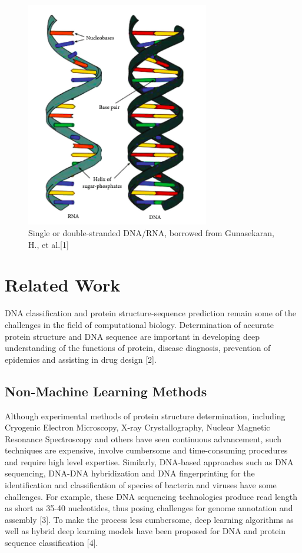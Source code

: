 \documentclass[journal]{IEEEtran}
\begin{document}
  \begin{figure}
    \centering
    \includegraphics[width=8cm]{figures/dna.png}
    \caption{Single or double-stranded DNA/RNA, borrowed from Gunasekaran, H., et al.[1]}
  \end{figure}

\section{Related Work}
  DNA classification and protein structure-sequence prediction remain some of the challenges in the field of computational biology. 
  Determination of accurate protein structure and DNA sequence are important in developing deep understanding of the functions of protein,
  disease diagnosis, prevention of epidemics and assisting in drug design [2]. 
  \subsection{Non-Machine Learning Methods}

    Although experimental methods of protein structure determination, including Cryogenic Electron Microscopy, 
    X-ray Crystallography, Nuclear Magnetic Resonance Spectroscopy and others have seen continuous advancement, 
    such techniques are expensive, involve cumbersome and time-consuming procedures and require high level expertise. 
    Similarly, DNA-based approaches such as DNA sequencing, DNA-DNA hybridization and DNA fingerprinting for the identification 
    and classification of species of bacteria and viruses have some challenges. For example, these DNA sequencing technologies 
    produce read length as short as 35-40 nucleotides, thus posing challenges for genome annotation and assembly [3].
    To make the process less cumbersome, deep learning algorithms as well as hybrid deep learning models have been proposed 
    for DNA and protein sequence classification [4].
\end{document}
